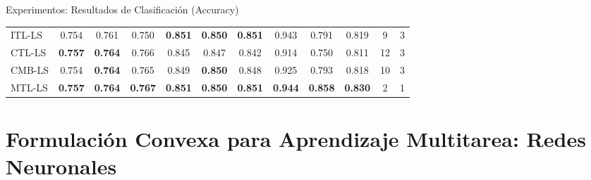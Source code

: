 \documentclass[aspectratio=43,spanish]{beamer}
\newcommand{\fmaxn}[1]{\textbf{#1}}
\newcommand{\fmod}[1]{\textsf{#1}}
\begin{document}
\begin{frame}{Experimentos: Resultados de Clasificación (Accuracy)}
\begin{table}[t]
{\begin{tabular}{ l*{8}{S[table-format=1.3]} c c c}
          \midrule
          \fmod{ITL-LS}    &          0.754 &           0.761 &                  0.750 &         \fmaxn{0.851} &          \fmaxn{0.850} &                 \fmaxn{0.851} &    0.943 &   0.791 & 0.819 &      9 & 3 \\
          \fmod{CTL-LS}    &          \fmaxn{0.757} &           \fmaxn{0.764} &                  0.766 &         0.845 &          0.847 &                 0.842 &    0.914 &   0.750 & 0.811 &     12 & 3 \\
          \fmod{CMB-LS} &          0.754 &           \fmaxn{0.764} &                  0.765 &         0.849 &          \fmaxn{0.850} &                 0.848 &    0.925 &   0.793 & 0.818 &     10 & 3 \\
          \fmod{MTL-LS}    &          \fmaxn{0.757} &           \fmaxn{0.764} &                  \fmaxn{0.767} &         \fmaxn{0.851} &          \fmaxn{0.850} &                 \fmaxn{0.851} &    \fmaxn{0.944} &   \fmaxn{0.858} & \fmaxn{0.830} &      2 & 1 \\
          \bottomrule  
        \end{tabular}}
        \end{table}
  
  \end{frame}

  


  \section{Formulación Convexa para Aprendizaje Multitarea: Redes Neuronales}
\end{document}
